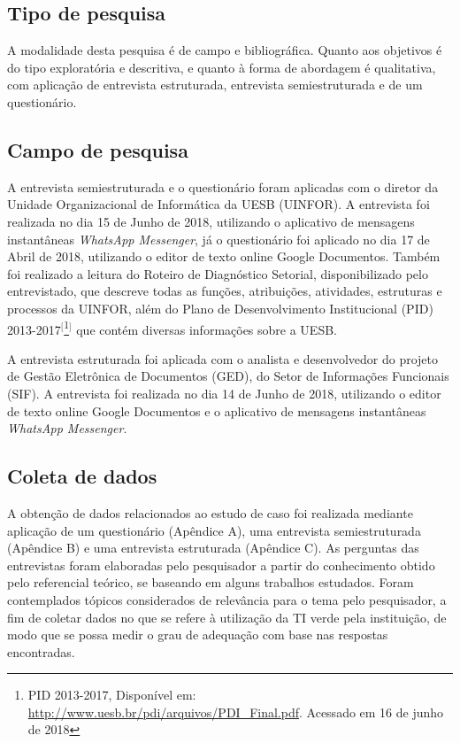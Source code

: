 \subsection{Tipo de pesquisa}
A modalidade desta pesquisa é de campo e bibliográfica. Quanto aos objetivos é do tipo exploratória e descritiva, e quanto à forma de abordagem é qualitativa, com aplicação de entrevista estruturada, entrevista semiestruturada e de um questionário.

\subsection{Campo de pesquisa}

A entrevista semiestruturada e o questionário foram aplicadas com o diretor da Unidade Organizacional de Informática da UESB (UINFOR). A entrevista foi realizada no dia 15 de Junho de 2018, utilizando o aplicativo de mensagens instantâneas \textit{WhatsApp Messenger}, já o questionário foi aplicado no dia 17 de Abril de 2018, utilizando o editor de texto online Google Documentos. Também foi realizado a leitura do Roteiro de Diagnóstico Setorial, disponibilizado pelo entrevistado, que descreve todas as funções, atribuições, atividades, estruturas e processos da UINFOR, além do Plano de Desenvolvimento Institucional (PID) 2013-2017$^{[}$\footnote{PID 2013-2017, Disponível em: \url{http://www.uesb.br/pdi/arquivos/PDI_Final.pdf}.  Acessado em 16 de junho de 2018}$^{]}$ que contém diversas informações sobre a UESB.

A entrevista estruturada foi aplicada com o analista e desenvolvedor do projeto de Gestão Eletrônica de Documentos (GED), do Setor de Informações Funcionais (SIF). A entrevista foi realizada no dia 14 de Junho de 2018, utilizando o editor de texto online Google Documentos e o aplicativo de mensagens instantâneas \textit{WhatsApp Messenger}.

\subsection{Coleta de dados}
A obtenção de dados relacionados ao estudo de caso foi realizada mediante aplicação de um questionário (Apêndice A), uma entrevista semiestruturada (Apêndice B) e uma entrevista estruturada (Apêndice C). As perguntas das entrevistas foram elaboradas pelo pesquisador a partir do conhecimento obtido pelo referencial teórico, se baseando em alguns trabalhos estudados. Foram contemplados tópicos considerados de relevância para o tema pelo pesquisador, a fim de coletar dados no que se refere à utilização da TI verde pela instituição, de modo que se possa medir o grau de adequação com base nas respostas encontradas.


